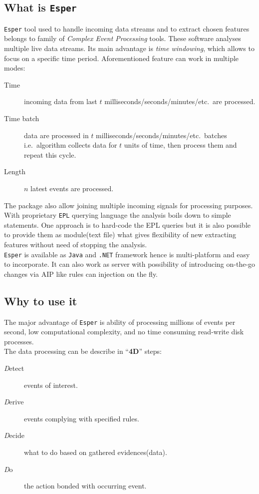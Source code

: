 \documentclass[11pt, letterpaper]{article}            %
\begin{document}
\subsection{What is \texttt{Esper}}
\texttt{Esper} tool used to handle incoming data streams and to extract chosen features belongs to family of \emph{Complex Event Processing} tools. These software analyses multiple live data streams. Its main advantage is \emph{time windowing}, which allows to focus on a specific time period. Aforementioned feature can work in multiple modes:
\begin{description}
	\item[Time] incoming data from last $t$ milliseconds/seconds/minutes/etc.\ are processed.
	\item[Time batch] data are processed in $t$ milliseconds/seconds/minutes/etc.\ batches i.e.\ algorithm collects data for $t$ units of time, then process them and repeat this cycle.
	\item[Length] $n$ latest events are processed.
\end{description}
The package also allow joining multiple incoming signals for processing purposes. With proprietary \texttt{EPL} querying language the analysis boils down to simple statements. One approach is to hard-code the EPL queries but it is also possible to provide them as module(text file) what gives flexibility of new extracting features without need of stopping the analysis.\\
\texttt{Esper} is available as \texttt{Java} and \texttt{.NET} framework hence is multi-platform and easy to incorporate. It can also work as server with possibility of introducing on-the-go changes via AIP like rules can injection on the fly.\\

\subsection{Why to use it}
The major advantage of \texttt{Esper} is ability of processing millions of events per second, low computational complexity, and no time consuming read-write disk processes.\\
The data processing can be describe in ``\textbf{4D}'' steps:
\begin{description}
\item[\textit{D}etect] events of interest.
\item [\textit{D}erive] events complying with specified rules.
\item [\textit{D}ecide] what to do based on gathered evidences(data).
\item [\textit{D}o] the action bonded with occurring event.
\end{description}
\end{document}
